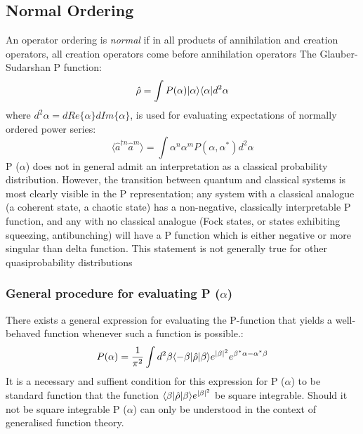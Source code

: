 \subsection{Normal Ordering}
An operator ordering is \emph{normal} if in all products of annihilation and creation operators, all creation operators come before annihilation operators \autocite{Mandl2010} The Glauber-Sudarshan P function\autocite{Cahill1969}:
\begin{equation}
	\hat{\rho} = \int P(\alpha) | \alpha \rangle \langle \alpha | d^2 \alpha
	\end{equation}
where $d^2 \alpha = dRe\{\alpha \}dIm\{\alpha \}$, is used for evaluating expectations of normally ordered power series:
\begin{equation}
	\langle \hat{a}^{\dagger n} \hat{a}^{m}  \rangle = \int \alpha^n \alpha^m P (\alpha, \alpha^*) d^2 \alpha
\end{equation}
P ($\alpha$) does not in general admit an interpretation as a classical probability distribution. However, the transition between quantum and classical systems is most clearly visible in the P representation; any system with a classical analogue (a coherent state, a chaotic state) has a non-negative, classically interpretable P function, and any with no classical analogue (Fock states, or states exhibiting squeezing, antibunching) will have a P function which is either negative or more singular than delta function. This statement is not generally true for other quasiprobability distributions\autocite{Mandel1995}
\subsubsection{General procedure for evaluating P ($\alpha$)}
\label{mehta}
There exists a general expression for evaluating the P-function that yields a well-behaved function whenever such a function is possible.\autocite{Mehta1967}:
\begin{equation}
	P(\alpha) = \frac{1}{\pi^2} \int d^2 \beta \langle-\beta | \hat{\rho} | \beta \rangle e^{|\beta|^2} e^{\beta^* \alpha -\alpha^* \beta}
\end{equation}
It is a necessary and suffient condition for this expression for P ($\alpha$) to be standard function that the function $ \langle\beta | \hat{\rho} | \beta \rangle e^{|\beta|^2} $ be square integrable. Should it not be square integrable P ($\alpha$) can only be understood in the context of generalised function theory.
